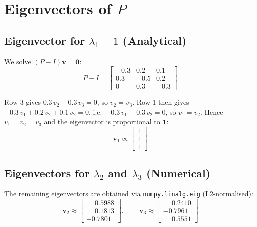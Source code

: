 \documentclass[12pt, a4paper]{article}
\begin{document}
\section{Eigenvectors of $P$}

\subsection*{Eigenvector for $\lambda_1 = 1$ (Analytical)}

We solve $(P - I)\mathbf{v} = \mathbf{0}$:
\begin{equation}
  P - I =
  \begin{bmatrix}
   -0.3 &  0.2 &  0.1 \\
    0.3 & -0.5 &  0.2 \\
    0   &  0.3 & -0.3
  \end{bmatrix}
\end{equation}

Row 3 gives $0.3\,v_2 - 0.3\,v_3 = 0$, so $v_2 = v_3$.
Row 1 then gives $-0.3\,v_1 + 0.2\,v_2 + 0.1\,v_2 = 0$, i.e.\
$-0.3\,v_1 + 0.3\,v_2 = 0$, so $v_1 = v_2$.
Hence $v_1 = v_2 = v_3$ and the eigenvector is proportional to $\mathbf{1}$:
\begin{equation}
  \mathbf{v}_1 \propto
  \begin{bmatrix} 1 \\ 1 \\ 1 \end{bmatrix}
\end{equation}

\subsection*{Eigenvectors for $\lambda_2$ and $\lambda_3$ (Numerical)}

The remaining eigenvectors are obtained via \texttt{numpy.linalg.eig} (L2-normalised):
\begin{equation}
  \mathbf{v}_2 \approx
  \begin{bmatrix} \phantom{-}0.5988 \\ \phantom{-}0.1813 \\ -0.7801 \end{bmatrix},
  \qquad
  \mathbf{v}_3 \approx
  \begin{bmatrix} \phantom{-}0.2410 \\ -0.7961 \\ \phantom{-}0.5551 \end{bmatrix}
\end{equation}
\end{document}
